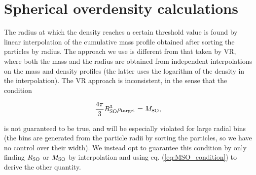 \documentclass{article}
\begin{document}


\section{Spherical overdensity calculations}

The radius at which the density reaches a certain threshold value is found by linear interpolation of the 
cumulative mass profile obtained after sorting the particles by radius. The approach we use is different from 
that taken by VR, where both the mass and the radius are obtained from independent interpolations on the mass 
and density profiles (the latter uses the logarithm of the density in the interpolation). The VR approach is 
inconsistent, in the sense that the condition

\begin{equation}
    \frac{4\pi{}}{3} R_{\rm{}SO}^3 \rho{}_{\rm{}target} = M_{\rm{}SO},\label{eq:MSO_condition}
\end{equation}

is not guaranteed to be true, and will be especially violated for large radial bins (the bins are generated 
from the particle radii by sorting the particles, so we have no control over their width). We instead opt to 
guarantee this condition by only finding $R_{\rm{}SO}$ or $M_{\rm{}SO}$ by interpolation and using eq. 
(\ref{eq:MSO_condition}) to derive the other quantity.
\end{document}
